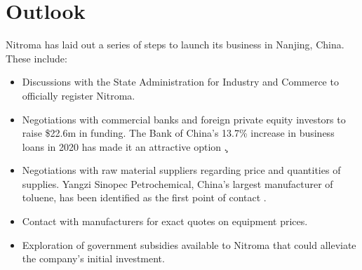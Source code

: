 \section{Outlook}
Nitroma has laid out a series of steps to launch its business in Nanjing, China. These include:
\begin{itemize}
    \item Discussions with the State Administration for Industry and Commerce to officially register Nitroma.
    \item Negotiations with commercial banks and foreign private equity investors to raise \$22.6m in funding. The Bank of China’s 13.7\% increase in business loans in 2020 has made it an attractive option \c.
    \item Negotiations with raw material suppliers regarding price and quantities of supplies. Yangzi Sinopec Petrochemical, China’s largest manufacturer of toluene, has been identified as the first point of contact \cite{sinopec_group_sinopec_2014}.
    \item Contact with manufacturers for exact quotes on equipment prices.
    \item Exploration of government subsidies available to Nitroma that could alleviate the company’s initial investment. 
\end{itemize}



